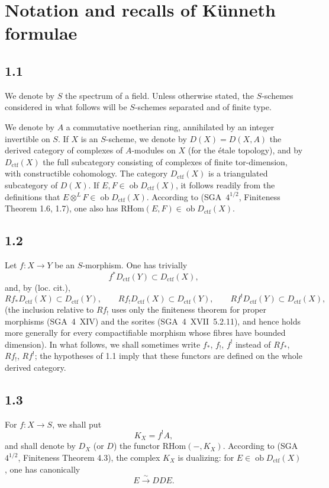 \documentclass[11pt]{article}
\newcommand{\ob}{\operatorname{ob}}
\providecommand{\RHom}{\mathrm{RHom}}
\providecommand{\ctf}{\mathrm{ctf}}
\providecommand{\RHom}{\mathrm{RHom}}
\providecommand{\ob}{\operatorname{ob}}
\providecommand{\RHom}{\mathrm R\mathcal{H}om}
\providecommand{\RHom}{\mathrm{RHom}}
\begin{document}
\section{Notation and recalls of Künneth formulae}

\subsection*{1.1}
We denote by $S$ the spectrum of a field. Unless otherwise stated, the $S$-schemes considered in what follows will be $S$-schemes separated and of finite type.

We denote by $A$ a commutative noetherian ring, annihilated by an integer invertible on $S$. If $X$ is an $S$-scheme, we denote by $D(X)=D(X,A)$ the derived category of complexes of $A$-modules on $X$ (for the étale topology), and by $D_{\ctf}(X)$ the full subcategory consisting of complexes of finite tor-dimension, with constructible cohomology. The category $D_{\ctf}(X)$ is a triangulated subcategory of $D(X)$. If $E,F\in\ob D_{\ctf}(X)$, it follows readily from the definitions that $E\otimes^L F\in\ob D_{\ctf}(X)$. According to (SGA~$4^{1/2}$, Finiteness Theorem 1.6, 1.7), one also has $\RHom(E,F)\in\ob D_{\ctf}(X)$.

\subsection*{1.2}
Let $f:X\to Y$ be an $S$-morphism. One has trivially
\[
f^{*}D_{\ctf}(Y) \subset D_{\ctf}(X),
\]
and, by (loc. cit.),
\[
Rf_{*}D_{\ctf}(X) \subset D_{\ctf}(Y),\qquad
Rf_{!}D_{\ctf}(X) \subset D_{\ctf}(Y),\qquad
Rf^{!}D_{\ctf}(Y) \subset D_{\ctf}(X),
\]
(the inclusion relative to $Rf_{!}$ uses only the finiteness theorem for proper morphisms (SGA~4~XIV) and the sorites (SGA~4~XVII~5.2.11), and hence holds more generally for every compactifiable morphism whose fibres have bounded dimension). In what follows, we shall sometimes write $f_{*}$, $f_{!}$, $f^{!}$ instead of $Rf_{*}$, $Rf_{!}$, $Rf^{!}$; the hypotheses of 1.1 imply that these functors are defined on the whole derived category.

\subsection*{1.3}
For $f:X\to S$, we shall put
\[
K_X=f^{!}A,
\]
and shall denote by $D_X$ (or $D$) the functor $\RHom(-,K_X)$. According to (SGA~$4^{1/2}$, Finiteness Theorem 4.3), the complex $K_X$ is dualizing: for $E\in\ob D_{\ctf}(X)$, one has canonically
\[
E \xrightarrow{\sim} DDE.
\]
\end{document}
